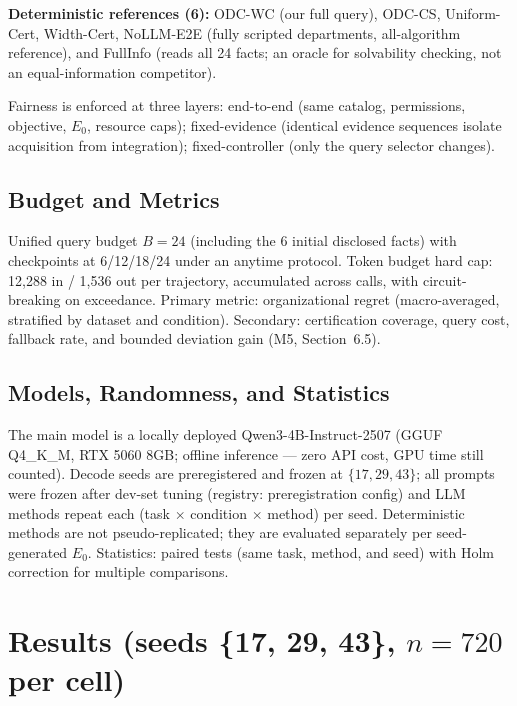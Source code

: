 \documentclass[letterpaper]{article}
\begin{document}
\textbf{Deterministic references (6):} ODC-WC (our full query), ODC-CS, Uniform-Cert, Width-Cert, NoLLM-E2E (fully scripted departments, all-algorithm reference), and FullInfo (reads all 24 facts; an oracle for solvability checking, not an equal-information competitor).

Fairness is enforced at three layers: end-to-end (same catalog, permissions, objective, $E_0$, resource caps); fixed-evidence (identical evidence sequences isolate acquisition from integration); fixed-controller (only the query selector changes).

\subsection{Budget and Metrics}
Unified query budget $B=24$ (including the 6 initial disclosed facts) with checkpoints at 6/12/18/24 under an anytime protocol. Token budget hard cap: 12{,}288 in / 1{,}536 out per trajectory, accumulated across calls, with circuit-breaking on exceedance. Primary metric: organizational regret (macro-averaged, stratified by dataset and condition). Secondary: certification coverage, query cost, fallback rate, and bounded deviation gain (M5, Section~6.5).

\subsection{Models, Randomness, and Statistics}
The main model is a locally deployed Qwen3-4B-Instruct-2507 (GGUF Q4\_K\_M, RTX 5060 8GB; offline inference --- zero API cost, GPU time still counted). Decode seeds are preregistered and frozen at $\{17, 29, 43\}$; all prompts were frozen after dev-set tuning (registry: preregistration config) and LLM methods repeat each (task $\times$ condition $\times$ method) per seed. Deterministic methods are not pseudo-replicated; they are evaluated separately per seed-generated $E_0$. Statistics: paired tests (same task, method, and seed) with Holm correction for multiple comparisons.

\section{Results (seeds \{17, 29, 43\}, $n{=}720$ per cell)}
\end{document}
